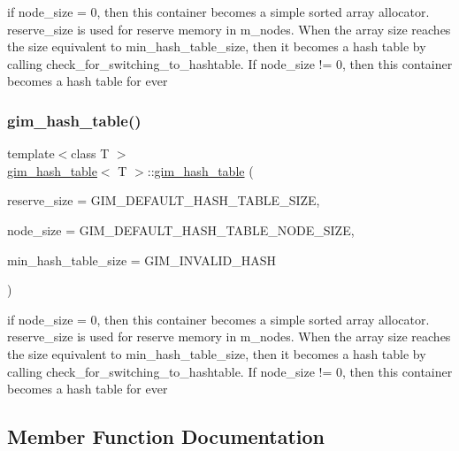 if node\+\_\+size = 0, then this container becomes a simple sorted array allocator. reserve\+\_\+size is used for reserve memory in m\+\_\+nodes. When the array size reaches the size equivalent to \textquotesingle{}min\+\_\+hash\+\_\+table\+\_\+size\textquotesingle{}, then it becomes a hash table by calling check\+\_\+for\+\_\+switching\+\_\+to\+\_\+hashtable.  If node\+\_\+size != 0, then this container becomes a hash table for ever  \mbox{\label{classgim__hash__table_aefe21c907c69c8077ec0886aaa778f6f}} 
\subsubsection{\texorpdfstring{gim\+\_\+hash\+\_\+table()}{gim\_hash\_table()}\hspace{0.1cm}{\footnotesize\ttfamily [2/2]}}
{\footnotesize\ttfamily template$<$class T $>$ \\
\hyperlink{classgim__hash__table}{gim\+\_\+hash\+\_\+table}$<$ T $>$\+::\hyperlink{classgim__hash__table}{gim\+\_\+hash\+\_\+table} (\begin{DoxyParamCaption}\item[{G\+U\+I\+NT}]{reserve\+\_\+size = {\ttfamily GIM\+\_\+DEFAULT\+\_\+HASH\+\_\+TABLE\+\_\+SIZE},  }\item[{G\+U\+I\+NT}]{node\+\_\+size = {\ttfamily GIM\+\_\+DEFAULT\+\_\+HASH\+\_\+TABLE\+\_\+NODE\+\_\+SIZE},  }\item[{G\+U\+I\+NT}]{min\+\_\+hash\+\_\+table\+\_\+size = {\ttfamily GIM\+\_\+INVALID\+\_\+HASH} }\end{DoxyParamCaption})\hspace{0.3cm}{\ttfamily [inline]}}

if node\+\_\+size = 0, then this container becomes a simple sorted array allocator. reserve\+\_\+size is used for reserve memory in m\+\_\+nodes. When the array size reaches the size equivalent to \textquotesingle{}min\+\_\+hash\+\_\+table\+\_\+size\textquotesingle{}, then it becomes a hash table by calling check\+\_\+for\+\_\+switching\+\_\+to\+\_\+hashtable.  If node\+\_\+size != 0, then this container becomes a hash table for ever  

\subsection{Member Function Documentation}
\mbox{\label{classgim__hash__table_a4339a279d721d1e687b8d8063332bac8}} 
